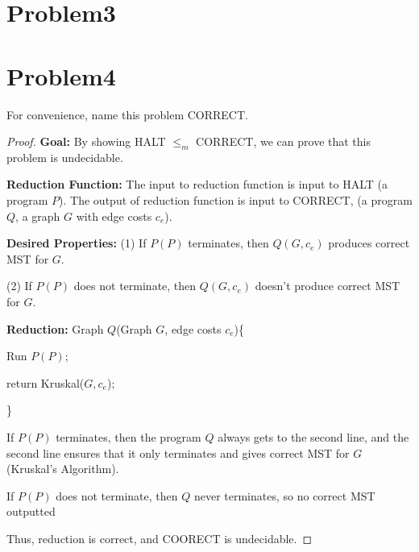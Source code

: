 \documentclass[openany]{article}
\begin{document}
\section*{Problem3}

\section*{Problem4}

For convenience, name this problem CORRECT.

\begin{proof}
    \textbf{Goal:} By showing HALT $\leqslant_m$ CORRECT, we can prove that this problem is undecidable. 

\textbf{Reduction Function:} The input to reduction function is input to HALT (a program $P$). The output of reduction function is input to CORRECT, (a program $Q$, a graph $G$ with edge costs $c_e$). 

\textbf{Desired Properties:}
(1) If $P(P)$ terminates, then $Q(G, c_e)$ produces correct MST for $G$.

(2) If $P(P)$ does not terminate, then $Q(G, c_e)$ doesn't produce correct MST for $G$.

\textbf{Reduction:}
Graph $Q$(Graph $G$, edge costs $c_e$)\{

\qquad Run $P(P)$;

\qquad return Kruskal($G, c_e$);

\}

If $P(P)$ terminates, then the program $Q$ always gets to the
second line, and the second line ensures that it only
terminates and gives correct MST for $G$ (Kruskal's Algorithm).

If $P(P)$ does not terminate, then $Q$ never terminates, so no correct MST outputted

Thus, reduction is correct, and COORECT is undecidable.


\end{proof}
\end{document}
